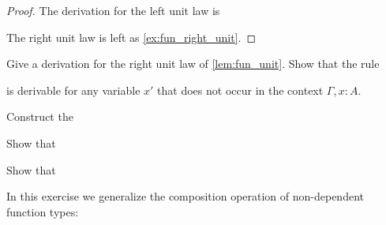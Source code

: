 \begin{proof}
The derivation for the left unit law is
\begin{prooftree}
\end{prooftree}
The right unit law is left as \cref{ex:fun_right_unit}.
\end{proof}

\begin{exercises}
\exercise \label{ex:fun_right_unit}Give a derivation for the right unit law of \cref{lem:fun_unit}.
\exercise Show that the rule
\begin{prooftree}
\end{prooftree}
is derivable for any variable $x'$ that does not occur in the context $\Gamma,x:A$.
\exercise 
  \begin{subexenum}
  \item Construct the 
    \begin{prooftree}
    \end{prooftree}
  \item Show that
    \begin{prooftree}
    \end{prooftree}
  \item Show that
    \begin{prooftree}
    \end{prooftree}
  \end{subexenum}
\exercise In this exercise we generalize the composition operation of non-dependent function types:

\end{exercises}
